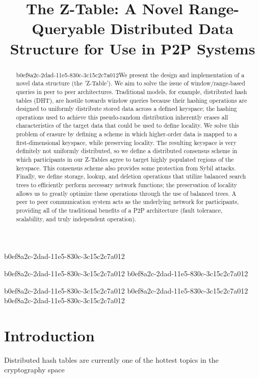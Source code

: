\documentclass[12pt]{article}
\title{The Z-Table: A Novel Range-Queryable Distributed Data Structure for Use in P2P Systems}
\begin{document}
b0ef8a2c-2dad-11e5-830c-3c15c2c7a012
\maketitle
b0ef8a2c-2dad-11e5-830c-3c15c2c7a012
b0ef8a2c-2dad-11e5-830c-3c15c2c7a012\begin{abstract}
b0ef8a2c-2dad-11e5-830c-3c15c2c7a012We present the design and implementation of a novel data structure (the 'Z-Table'). We aim to solve the issue of window/range-based queries in peer to peer architectures. Traditional models, for example,  distributed hash tables (DHT), are hostile towards window queries because their hashing operations are designed to uniformly distribute stored data across a defined keyspace; the hashing operations used to achieve this pseudo-random distribution inherently erases all characteristics of the target data that could be used to define locality. We solve this problem of erasure by defining a scheme in which higher-order data is mapped to a first-dimensional keyspace, while preserving locality. The resulting keyspace is very definitely not uniformly distributed, so we define a distributed consensus scheme in which participants in our Z-Tables agree to target highly populated regions of the keyspace. This consensus scheme also provides some protection from Sybil attacks. Finally, we define storage, lookup, and deletion operations that utilize balanced search trees to efficiently perform necessary network functions; the preservation of locality allows us to greatly optimize these operations through the use of balanced trees. A peer to peer communication system acts as the underlying network for participants, providing all of the traditional benefits of a P2P architecture (fault tolerance, scalability, and truly independent operation).
\end{abstract}
b0ef8a2c-2dad-11e5-830c-3c15c2c7a012
b0ef8a2c-2dad-11e5-830c-3c15c2c7a012
b0ef8a2c-2dad-11e5-830c-3c15c2c7a012\newpage
\section{Introduction}
Distributed hash tables are currently one of the hottest topics in the cryptography space~\cite{Stoica:2001dj,Rowstron:2001ea,Ratnasamy:2001wn}

\printbibliography
\end{document}
